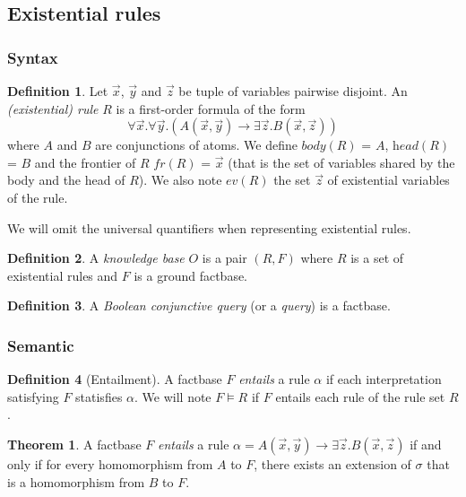 \documentclass{article}
\theoremstyle{definition}
\newtheorem{definition}{Definition}[section]
\newtheorem{theorem}{Theorem}[section]
\theoremstyle{remark}
\begin{document}
\subsection{Existential rules}

\subsubsection{Syntax}

\begin{definition}
Let $\vec x$, $\vec y$ and $\vec z$ be tuple of variables pairwise disjoint. An \emph{(existential) rule} $R$ is a first-order formula	of the form $$\forall \vec x.\forall \vec y.( A(\vec x,\vec y) \rightarrow \exists \vec z. B(\vec x,\vec z))$$ where $A$ and $B$ are conjunctions of atoms. We define \emph{$\textit{body}(R)$} = $A$, \emph{$\textit{head}(R)$} = $B$ and the frontier of $R$ \emph{$\textit{fr}(R)$} = $\vec x$ (that is the set of variables shared by the body and the head of $R$). We also note \emph{$\textit{ev}(R)$} the set $\vec{z}$ of existential variables of the rule.
\end{definition}
We will omit the universal quantifiers when representing existential rules.
\begin{definition}
A \emph{knowledge base} $O$ is a pair $(R,F)$ where $R$ is a set of existential rules and $F$ is a  ground factbase.
\end{definition}

\begin{definition}
A \emph{Boolean conjunctive query} (or a \emph{query}) is a factbase.
\end{definition}

\subsubsection{Semantic}

\begin{definition}[Entailment]
A factbase $F$ \emph{entails} a rule $\alpha$ if each interpretation satisfying $F$ statisfies $\alpha$. We will note $F \models R$ if $F$ entails each rule of the rule set $R$.
\end{definition}

\begin{theorem}
A factbase $F$ \emph{entails} a rule $\alpha = A(\vec x,\vec y) \rightarrow \exists \vec z. B(\vec x,\vec z)$ if and only if for every homomorphism from $A$ to $F$, there exists an extension of $\sigma$ that is a homomorphism from $B$ to $F$.
\end{theorem}
\end{document}

